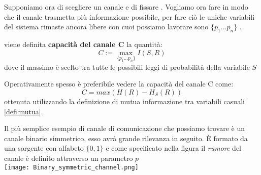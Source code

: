 Supponiamo ora di scegliere un canale e di fissare \lepc . Vogliamo ora fare in modo che il canale trasmetta più informazione possibile, per fare ciò le uniche variabili del sistema rimaste ancora libere con cuoi possiamo lavorare sono $\{p_1...p_n \}$ .
\begin{defi}
viene definita \textbf{capacità del canale C} la quantità:
\begin{equation}
C:= \max_{ \{ p_1...p_n \}} I(S,R)
\end{equation}
dove il massimo è scelto tra tutte le possibili leggi di probabilità della variabile $S$
\end{defi}
Operativamente spesso è preferibile vedere la capacità del canale C come:
\begin{equation}
C=max(H(R)-H_S(R))
\end{equation}
ottenuta utilizzando la definizione di mutua informazione tra variabili casuali \ref{defi:mutua}.\\
\begin{oss} \label{oss:bsc}
Il più semplice esempio di canale di comunicazione che possiamo trovare è un canale binario simmetrico, esso avrà grande rilevanza in seguito. È formato da una sorgente  con alfabeto $\{ 0 , 1 \}$ e come specificato nella figura il \textit{rumore} del canale è definito attraverso un parametro $p$
\\


\texttt{[image: Binary\_symmetric\_channel.png]} \label{fig:bsc}
\end{oss}
